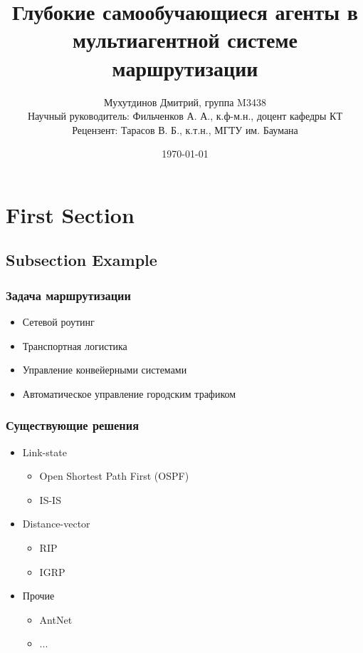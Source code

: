 \documentclass{beamer}
\title[DQN-routing]{Глубокие самообучающиеся агенты в мультиагентной системе маршрутизации}
\author[Дмитрий Мухутдинов, М3438]{
    Мухутдинов Дмитрий, группа M3438 \\
    Научный руководитель: Фильченков А. А., к.ф-м.н., доцент кафедры КТ \\
    Рецензент: Тарасов В. Б., к.т.н., МГТУ им. Баумана
}%
\institute[ИТМО] %
{
    Кафедра Компьютерных Технологий \\
    Факультет Информационных Технологий и Программирования \\
    Университет ИТМО, Санкт-Петербург
}
\date{\today} %
\begin{document}
\frame{\titlepage}


\section{First Section} 

\subsection{Subsection Example} %

\begin{frame}
  \frametitle{Задача маршрутизации}
  \begin{itemize}
  \item Сетевой роутинг
  \item Транспортная логистика
  \item Управление конвейерными системами
  \item Автоматическое управление городским трафиком
  \end{itemize}
\end{frame}


\begin{frame}
  \frametitle{Существующие решения}
  \begin{itemize}
  \item Link-state
    \begin{itemize}
    \item Open Shortest Path First (OSPF)
    \item IS-IS
    \end{itemize}
  \item Distance-vector
    \begin{itemize}
    \item RIP
    \item IGRP
    \end{itemize}
  \item Прочие
    \begin{itemize}
    \item AntNet
    \item ...
    \end{itemize}
  \end{itemize}
\end{frame}
\end{document}
